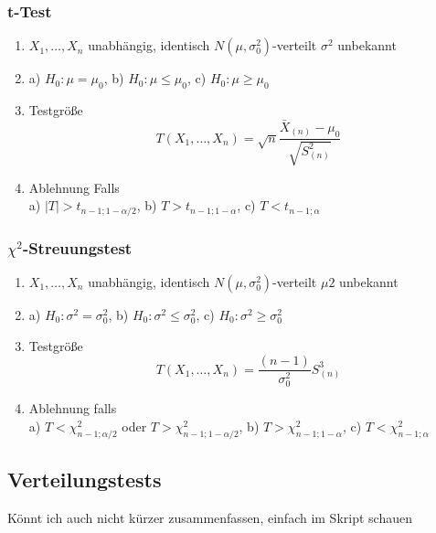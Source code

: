 \documentclass[
	ngerman,
	accentcolor=9c,%
	type=intern,
	marginpar=false
	]{tudapub}
\begin{document}
                \subsubsection*{t-Test}
                     \begin{enumerate}
                         \item $X_1,\dots,X_n$ unabhängig, identisch $N(\mu, \sigma^2_0)$-verteilt $\sigma^2$ unbekannt
                         \item a) $H_0: \mu = \mu_0$, b) $H_0: \mu \leq \mu_0$, c) $H_0: \mu \geq \mu_0$     
                         \item Testgröße
                         \begin{equation*}
                             T(X_1,\dots,X_n)=\sqrt{n}\dfrac{\bar{X}_{(n)}-\mu_0}{\sqrt{S_{(n)}^2}}
                         \end{equation*} 
                         \item Ablehnung Falls\\
                               a) $|T| > t_{n-1;1-\alpha/2}$, b) $T > t_{n-1;1-\alpha}$, c) $T < t_{n-1;\alpha}$
                     \end{enumerate}
                \subsubsection*{$\chi^2$-Streuungstest}
                    \begin{enumerate}
                        \item $X_1,\dots,X_n$ unabhängig, identisch $N(\mu, \sigma^2_0)$-verteilt $\mu2$ unbekannt
                        \item a) $H_0: \sigma^2 = \sigma^2_0$, b) $H_0: \sigma^2 \leq \sigma^2_0$, c) $H_0: \sigma^2 \geq \sigma^2_0$
                        \item Testgröße
                        \begin{equation*}
                            T(X_1,\dots,X_n)=\dfrac{(n-1)}{\sigma^2_0}S^3_{(n)}
                        \end{equation*}
                        \item Ablehnung falls\\
                        a) $T<\chi^2_{n-1;\alpha/2}$ oder $T>\chi^2_{n-1;1-\alpha/2}$, 
                        b) $T>\chi^2_{n-1;1-\alpha}$, 
                        c) $T<\chi^2_{n-1;\alpha}$
                    \end{enumerate}
            \subsection{Verteilungstests}
                Könnt ich auch nicht kürzer zusammenfassen, einfach im Skript schauen
\end{document}
